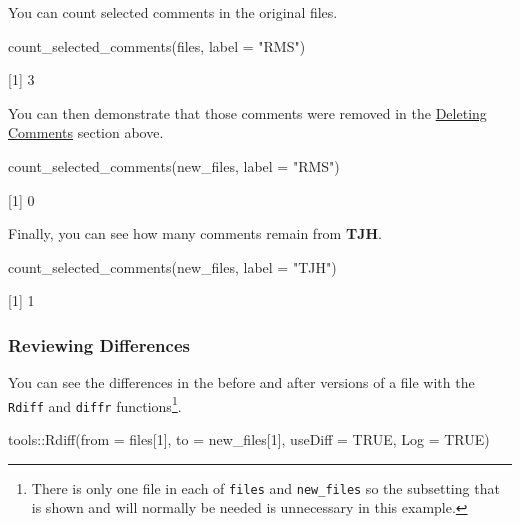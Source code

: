 \documentclass[
]{article}
\newenvironment{Shaded}{\begin{snugshade}}{\end{snugshade}}
\newcommand{\AttributeTok}[1]{\textcolor[rgb]{0.77,0.63,0.00}{#1}}
\newcommand{\ConstantTok}[1]{\textcolor[rgb]{0.00,0.00,0.00}{#1}}
\newcommand{\DecValTok}[1]{\textcolor[rgb]{0.00,0.00,0.81}{#1}}
\newcommand{\FunctionTok}[1]{\textcolor[rgb]{0.00,0.00,0.00}{#1}}
\newcommand{\NormalTok}[1]{#1}
\newcommand{\SpecialCharTok}[1]{\textcolor[rgb]{0.00,0.00,0.00}{#1}}
\newcommand{\StringTok}[1]{\textcolor[rgb]{0.31,0.60,0.02}{#1}}
\begin{document}
You can count selected comments in the original files.

\begin{Shaded}
\begin{Highlighting}[]
\FunctionTok{count\_selected\_comments}\NormalTok{(files, }\AttributeTok{label =} \StringTok{"RMS"}\NormalTok{)}
\end{Highlighting}
\end{Shaded}

{[}1{]} 3

You can then demonstrate that those comments were removed in the
\href{Deleting\%20Comments}{Deleting Comments} section above.

\begin{Shaded}
\begin{Highlighting}[]
\FunctionTok{count\_selected\_comments}\NormalTok{(new\_files, }\AttributeTok{label =} \StringTok{"RMS"}\NormalTok{)}
\end{Highlighting}
\end{Shaded}

{[}1{]} 0

Finally, you can see how many comments remain from \textbf{TJH}.

\begin{Shaded}
\begin{Highlighting}[]
\FunctionTok{count\_selected\_comments}\NormalTok{(new\_files, }\AttributeTok{label =} \StringTok{"TJH"}\NormalTok{)}
\end{Highlighting}
\end{Shaded}

{[}1{]} 1

\hypertarget{reviewing-differences}{%
\subsubsection{Reviewing Differences}\label{reviewing-differences}}

You can see the differences in the before and after versions of a file
with the \texttt{Rdiff} and \texttt{diffr} functions\footnote{ There is
  only one file in each of \texttt{files} and \texttt{new\_files} so the
  subsetting that is shown and will normally be needed is unnecessary in
  this example.}.

\begin{Shaded}
\begin{Highlighting}[]
\NormalTok{tools}\SpecialCharTok{::}\FunctionTok{Rdiff}\NormalTok{(}\AttributeTok{from =}\NormalTok{ files[}\DecValTok{1}\NormalTok{], }\AttributeTok{to =}\NormalTok{ new\_files[}\DecValTok{1}\NormalTok{], }\AttributeTok{useDiff =} \ConstantTok{TRUE}\NormalTok{, }\AttributeTok{Log =} \ConstantTok{TRUE}\NormalTok{)}
\end{Highlighting}
\end{Shaded}
\end{document}
